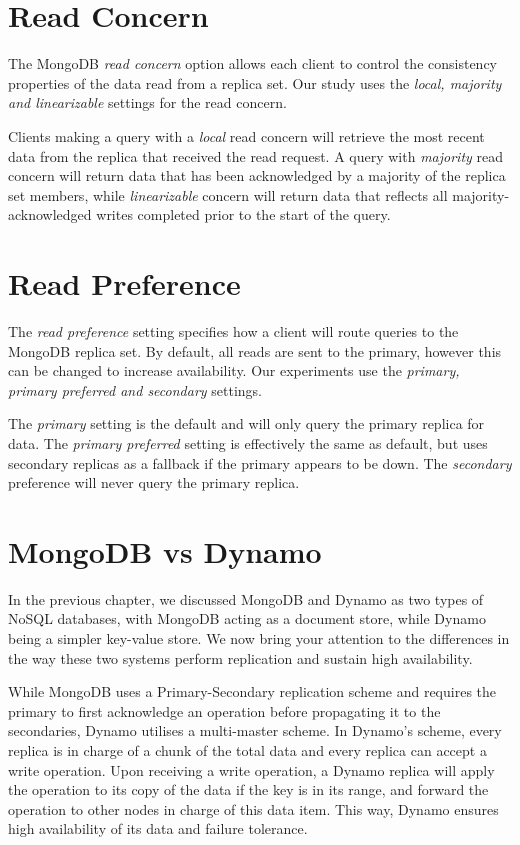 \section{Read Concern}
The MongoDB \textit{read concern} option allows each client to control the consistency properties of the data read from a replica set. Our study uses the \textit{local, majority and linearizable} settings for the read concern.

Clients making a query with a \textit{local} read concern will retrieve the most recent data from the replica that received the read request. A query with \textit{majority} read concern will return data that has been acknowledged by a majority of the replica set members, while \textit{linearizable} concern will return data that reflects all majority-acknowledged writes completed prior to the start of the query.

\section{Read Preference} \label{sec:readpref}

The \textit{read preference} setting specifies how a client will route queries to the MongoDB replica set. By default, all reads are sent to the primary, however this can be changed to increase availability. Our experiments use the \textit{primary, primary preferred and secondary} settings.

The \textit{primary} setting is the default and will only query the primary replica for data. The \textit{primary preferred} setting is effectively the same as default, but uses secondary replicas as a fallback if the primary appears to be down. The \textit{secondary} preference will never query the primary replica.

\section{MongoDB vs Dynamo}
In the previous chapter, we discussed MongoDB and Dynamo as two types of NoSQL databases, with MongoDB acting as a document store, while Dynamo being a simpler key-value store. We now bring your attention to the differences in the way these two systems perform replication and sustain high availability.

While MongoDB uses a Primary-Secondary replication scheme and requires the primary to first acknowledge an operation before propagating it to the secondaries, Dynamo utilises a multi-master scheme. In Dynamo's scheme, every replica is in charge of a chunk of the total data and every replica can accept a write operation. Upon receiving a write operation, a Dynamo replica will apply the operation to its copy of the data if the key is in its range, and forward the operation to other nodes in charge of this data item. This way, Dynamo ensures high availability of its data and failure tolerance. 

